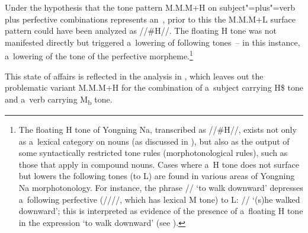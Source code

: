 Under the hypothesis that the tone pattern M.M.M+H on subject"=plus"=verb plus {perfective} combinations represents an~, prior to this  the M.M.M+L surface pattern
could have been analyzed as \mbox{//\#H//}. The floating H tone was not manifested directly but triggered
a~lowering of following tones~-- in this instance, a~lowering of the tone of the {perfective}
morpheme.\footnote{The floating H tone of Yongning Na, transcribed as \mbox{//\#H//}, exists not only as a~lexical category on nouns (as discussed in ), but also as the output of some syntactically restricted tone rules (morphotonological rules), such as those that apply in {compound} nouns. Cases where a~H tone does not surface but lowers the following tones (to L) are found in various areas of Yongning Na morphotonology. For instance, the phrase // ‘to walk downward’ depresses a~following {perfective} (////, which has lexical M tone) to L: // ‘(s)he walked downward’; this is interpreted as evidence of the presence of a~floating H tone in the expression ‘to walk downward’ (see ).}

This state of affairs is reflected in the analysis in , which leaves out the
problematic variant M.M.M+H for the combination of a~subject carrying H\$ tone and a~verb carrying M\textsubscript{b} tone.

